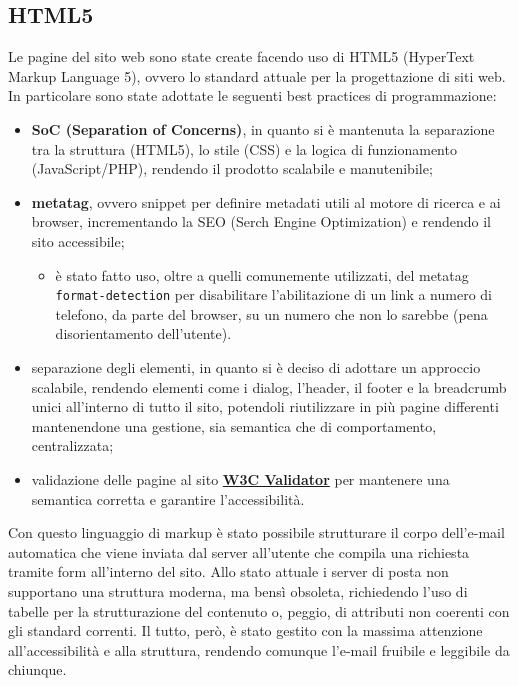 \documentclass[a4paper,10pt]{article}
\begin{document}
	\subsection{HTML5}
	Le pagine del sito web sono state create facendo uso di HTML5 (HyperText Markup Language 5), ovvero lo standard attuale per la progettazione di siti web. In particolare sono state adottate le seguenti best practices di programmazione:
	\begin{itemize}
		\item \textbf{SoC (Separation of Concerns)}, in quanto si è mantenuta la separazione tra la struttura (HTML5), lo stile (CSS) e la logica di funzionamento (JavaScript/PHP), rendendo il prodotto scalabile e manutenibile;
		\item \textbf{metatag}, ovvero snippet per definire metadati utili al motore di ricerca e ai browser, incrementando la SEO (Serch Engine Optimization) e rendendo il sito accessibile;
		\begin{itemize}
			\item è stato fatto uso, oltre a quelli comunemente utilizzati, del metatag \texttt{format-detection} per disabilitare l'abilitazione di un link a numero di telefono, da parte del browser, su un numero che non lo sarebbe (pena disorientamento dell'utente).
		\end{itemize}
		\item separazione degli elementi, in quanto si è deciso di adottare un approccio scalabile, rendendo elementi come i dialog, l'header, il footer e la breadcrumb unici all'interno di tutto il sito, potendoli riutilizzare in più pagine differenti mantenendone una gestione, sia semantica che di comportamento, centralizzata;
		\item validazione delle pagine al sito \textbf{\href{https://validator.w3.org/}{W3C Validator}} per mantenere una semantica corretta e garantire l'accessibilità.
	\end{itemize}
	Con questo linguaggio di markup è stato possibile strutturare il corpo dell'e-mail automatica che viene inviata dal server all'utente che compila una richiesta tramite form all'interno del sito. Allo stato attuale i server di posta non supportano una struttura moderna, ma bensì obsoleta, richiedendo l'uso di tabelle per la strutturazione del contenuto o, peggio, di attributi non coerenti con gli standard correnti. Il tutto, però, è stato gestito con la massima attenzione all'accessibilità e alla struttura, rendendo comunque l'e-mail fruibile e leggibile da chiunque.
\end{document}
